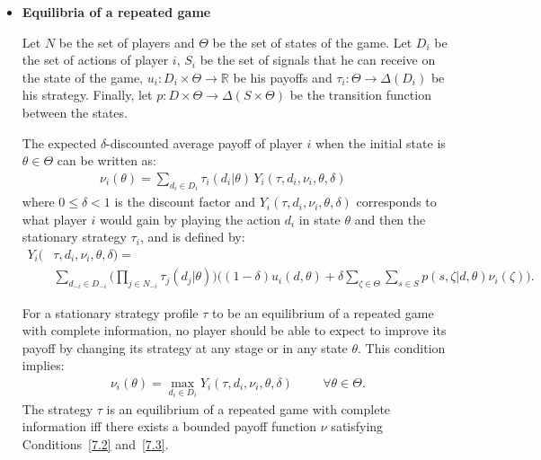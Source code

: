 \documentclass[a4paper,notitlepage,11pt]{article}
\begin{document}
\begin{itemize}[leftmargin=*]
\renewcommand{\labelitemi}{$\bullet$}

	\item \textbf{Equilibria of a repeated game}
	\vspace{.3cm}

	Let $N$ be the set of players and $\Theta$ be the set of states of the game. Let $D_i$ be the set of actions of player $i$, $S_i$ be the set of signals that he can receive on the state of the game, $u_i : D_i \times \Theta \rightarrow \mathbb{R}$ be his payoffs and $\tau_i : \Theta \rightarrow \Delta(D_i)$ be his strategy. Finally, let $p : D \times \Theta \rightarrow \Delta(S \times \Theta)$ be the transition function between the states.
	
	The expected $\delta$-discounted average payoff of player $i$ when the initial state is $\theta \in \Theta$ can be written as:
	\begin{align}
		\nu_i(\theta) = \sum_{d_i \in D_i} \tau_i(d_i|\theta) \, Y_i(\tau , d_i , \nu_i , \theta , \delta) \hspace{1cm}
		\label{7.2}
	\end{align}
	where $0 \leq \delta < 1$ is the discount factor and $Y_i(\tau , d_i , \nu_i , \theta , \delta)$ corresponds to what player $i$ would gain by playing the action $d_i$ in state $\theta$ and then the stationary strategy $\tau_i$, and is defined by:
	\begin{align*}
		Y_i(&\tau , d_i , \nu_i , \theta , \delta) = \\ &\sum_{d_{-i} \in D_{-i}} \Bigg( \prod_{j \in N_{-i}} \tau_j(d_j|\theta) \Bigg)\Bigg( (1-\delta)u_i(d,\theta)+\delta \sum_{\zeta \in \Theta} \sum_{s \in S}p(s, \zeta|d,\theta)\nu_i(\zeta)\Bigg).
	\end{align*}
	
	For a stationary strategy profile $\tau$ to be an equilibrium of a repeated game with complete information, no player should be able to expect to improve its payoff by changing its strategy at any stage or in any state $\theta$. This condition implies:
	\begin{align}
		\nu_i(\theta)= \max_{d_i \in D_i} Y_i(\tau , d_i , \nu_i , \theta , \delta) \hspace{1cm} \forall \theta \in \Theta.
		\label{7.3}
	\end{align}
	The strategy $\tau$ is an equilibrium of a repeated game with complete information iff there exists a bounded payoff function $\nu$ satisfying Conditions~\eqref{7.2} and~\eqref{7.3}.

	\vspace{.3cm}

\end{itemize}
\end{document}
